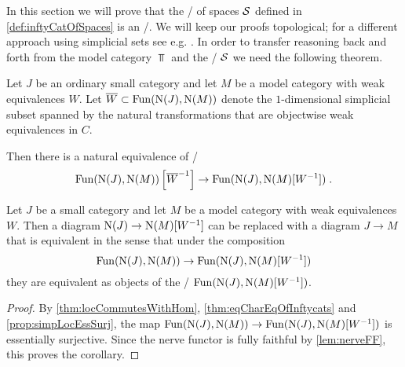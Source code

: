 In this section we will prove that the \inftycat/ of spaces $\mathcal{S}$ defined in \cref{def:inftyCatOfSpaces} is an \inftytop/.
We will keep our proofs topological; for a different approach using simplicial sets see e.g. \cite[\S 6]{HTT}.
In order to transfer reasoning back and forth from the model category $\Top$ and the \inftycat/ $\mathcal{S}$ we need the following theorem. %
\begin{thm}\label{thm:locCommutesWithHom} 
    Let $J$ be an ordinary small category and let $M$ be a model category with weak equivalences $W$.
    Let $\overline{W}\subset\operatorname{Fun}(\operatorname{N}(J),\operatorname{N}(M))$ denote the $1$-dimensional simplicial subset spanned by the natural transformations that are objectwise weak equivalences in $C$.
    
    Then there is a natural equivalence of \inftycats/
    \begin{equation*}
        \operatorname{Fun}(\operatorname{N}(J),\operatorname{N}(M))\left[\overline{W}^{-1}\right]\to\operatorname{Fun}(\operatorname{N}(J),\operatorname{N}(M)[W^{-1}])\;.
    \end{equation*} 
    \begin{reference}
        \cite[Remark 7.9.7 and Theorem 7.9.8]{cisinski_2019}
    \end{reference}
\end{thm}
\begin{corollary}\label{cor:replaceWithStrictDiagram}
    Let $J$ be a small category and let $M$ be a model category with weak equivalences $W$.
    Then a diagram $\operatorname{N}(J)\to\operatorname{N}(M)[W^{-1}]$ can be replaced with a diagram $J\to M$ that is equivalent in the sense that under the composition
    \begin{equation*}
        \operatorname{Fun}(\operatorname{N}(J),\operatorname{N}(M))\to\operatorname{Fun}(\operatorname{N}(J),\operatorname{N}(M)[W^{-1}])
    \end{equation*} 
    they are equivalent as objects of the \inftycat/ $\operatorname{Fun}(\operatorname{N}(J),\operatorname{N}(M)[W^{-1}])$.
    \begin{proof}
        By \cref{thm:locCommutesWithHom}, \cref{thm:eqCharEqOfInftycats} and \cref{prop:simpLocEssSurj}, the map $\operatorname{Fun}(\operatorname{N}(J),\operatorname{N}(M))\to\operatorname{Fun}(\operatorname{N}(J),\operatorname{N}(M)[W^{-1}])$ is essentially surjective.
        Since the nerve functor is fully faithful by \cref{lem:nerveFF}, this proves the corollary.
    \end{proof}
\end{corollary}
